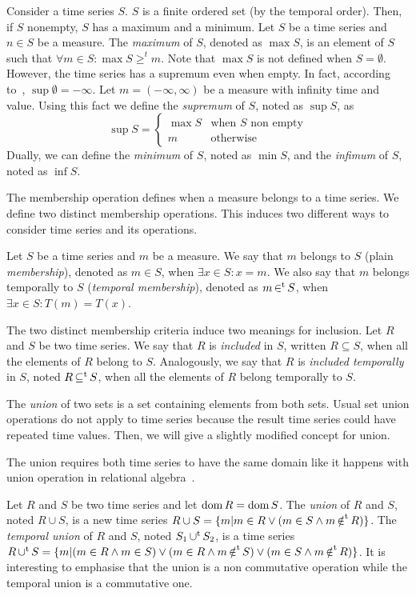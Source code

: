 Consider a time series $S$. $S$ is a finite ordered set (by the
temporal order). Then, if $S$ nonempty, $S$ has a maximum and a
minimum.  
%
Let $S$ be a time series and $n\in S$ be a measure. The \emph{maximum}
of $S$, denoted as $\max S$, is an element of $S$ such that $\forall m
\in S:\max S\geq^t m $.  
%
Note that $\max S$ is not defined when $S=\emptyset$. However, the
time series has a supremum even when empty. In fact, according
to~\cite{cantrell:extendedreal}, $\sup \emptyset=-\infty$.
%
Let $m=(-\infty,\infty)$ be a measure with infinity time and value.
Using this fact we define the \emph{supremum} of $S$, noted as
$\sup S$, as
\[
\sup S =\begin{cases}
  \max S    & \text{when $S$ non empty}\\
  m   & \text{otherwise}
\end{cases}
\]
Dually, we can define the \emph{minimum} of $S$, noted as $\min S$,
and the \emph{infimum} of $S$, noted as $\inf S$.

The membership operation defines when a measure belongs to a time
series. We define two distinct membership operations. This induces two
different ways to consider time series and its operations.

Let $S$ be a time series and $m$ be a measure. 
%
We say that $m$ belongs to $S$ (plain \emph{membership}), denoted as
$m \in S$, when $\exists x\in S: x=m$.  We also say that $m$ belongs
temporally to $S$ (\emph{temporal membership}), denoted as $m \operatorname*{\in^t}
S$, when $\exists x\in S : T(m)=T(x)$.


The two distinct membership criteria induce two meanings for
inclusion. Let $R$ and $S$ be two time series.  We say that $R$ is
\emph{included} in $S$, written $R\subseteq S$, when all the elements
of $R$ belong to $S$.  Analogously, we say that $R$ is \emph{included
  temporally} in $S$, noted $R\operatorname*{\subseteq^t} S$, when all the elements of
$R$ belong temporally to $S$.


The \emph{union} of two sets is a set containing elements from both
sets. Usual set union operations do not apply to time series because
the result time series could have repeated time values.  Then, we will
give a slightly modified concept for union.

The union requires both time series to have the same domain like it
happens with union operation in relational
algebra~\cite{date:introduction}.

Let $R$ and $S$ be two time series and let $\operatorname{dom} R =\operatorname{dom} S$. 
%
The \emph{union} of $R$ and $S$, noted $R\cup S$, is a new time series
$R \cup S = \{m|m\in R\vee (m\in S\wedge m \operatorname*{\notin^t} R)\}$. 
%
The \emph{temporal union} of $R$ and $S$, noted $S_1 \operatorname*{\cup^t} S_2$, is a
time series $R \operatorname*{\cup^t} S = \{ m | (m \in R \wedge m \in S) \vee (m \in R
\wedge m \operatorname*{\notin^t} S) \vee (m \in S \wedge m \operatorname*{\notin^t} R) \}$.  
%
It is interesting to emphasise that the union is a non commutative
operation while the temporal union is a commutative one.

